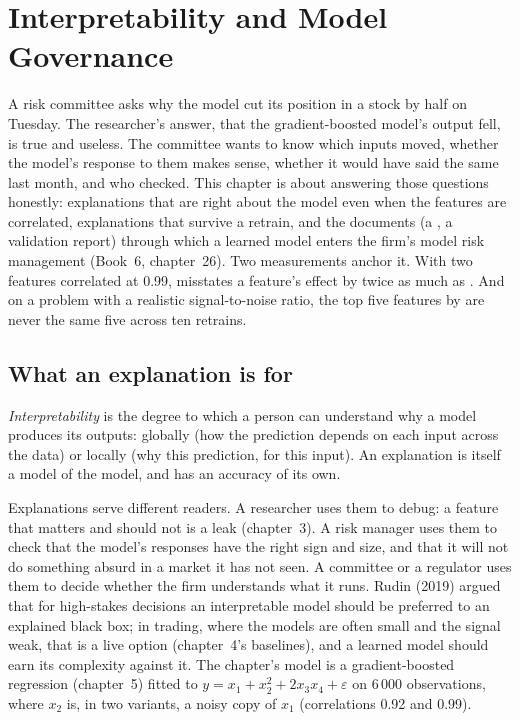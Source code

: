 \chapter{Interpretability and Model Governance}\label{ch:ml:interpretability-and-model-governance}

A risk committee asks why the model cut its position in a stock by half on Tuesday. The researcher's answer, that the
gradient-boosted model's output fell, is true and useless. The committee wants to know which inputs moved, whether the
model's response to them makes sense, whether it would have said the same last month, and who checked. This chapter is about
answering those questions honestly: explanations that are right about the model even when the features are correlated,
explanations that survive a retrain, and the documents (a , a validation report) through which a learned model
enters the firm's model risk management (Book~6, chapter~26). Two measurements anchor it. With two features correlated at
0.99,  misstates a feature's effect by twice as much as . And on a problem with
a realistic signal-to-noise ratio, the top five features by  are never the same five across ten retrains.

\section{What an explanation is for}

\begin{definition}[Interpretability]\label{def:ml:interpretability-and-model-governance:interp}
\emph{Interpretability} is the degree to which a person can understand why a model produces its
outputs: globally (how the prediction depends on each input across the data) or locally (why this prediction, for this
input). An explanation is itself a model of the model, and has an accuracy of its own.
\end{definition}

Explanations serve different readers. A researcher uses them to debug: a feature that matters and should not is a leak
(chapter~3). A risk manager uses them to check that the model's responses have the right sign and size, and that it will not
do something absurd in a market it has not seen. A committee or a regulator uses them to decide whether the firm understands
what it runs. Rudin (2019) argued that for high-stakes decisions an interpretable model should be preferred to an explained
black box; in trading, where the models are often small and the signal weak, that is a live option (chapter~4's baselines),
and a learned model should earn its complexity against it. The chapter's model is a gradient-boosted regression (chapter~5)
fitted to $y = x_1 + x_2^2 + 2x_3x_4 + \varepsilon$ on 6\,000 observations, where $x_2$ is, in two variants, a noisy copy of
$x_1$ (correlations 0.92 and 0.99).

